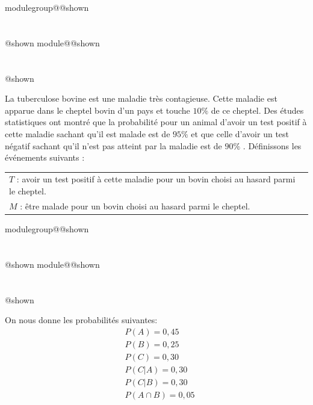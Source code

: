\documentclass{Evaluation}
\makeatletter
\newcommand{\currentmodulekey}{}
\newcommand{\currentmoduletitle}{}
\newcommand{\currentgroupkey}{}
\newcommand{\currentgrouptitle}{}
\newcommand{\showmoduleifneeded}{%
  \ifx\currentgroupkey\empty\else
    \expandafter\ifx\csname modulegroup@\currentgroupkey @shown\endcsname\relax
      \section*{\currentgrouptitle}%
      \expandafter\gdef\csname modulegroup@\currentgroupkey @shown\endcsname{1}%
    \fi
  \fi
  \expandafter\ifx\csname module@\currentmodulekey @shown\endcsname\relax
    \section*{\currentmoduletitle}%
    \expandafter\gdef\csname module@\currentmodulekey @shown\endcsname{1}%
  \fi
}
\newenvironment{H25}{\showmoduleifneeded}{}
\newenvironment{A25}{\showmoduleifneeded}{}
\makeatother
\begin{document}
\begin{questions}
\begin{H25}
\question {} %
La tuberculose bovine est une maladie très contagieuse. Cette maladie est apparue dans  le cheptel bovin d'un pays et touche $10 \%$ de ce cheptel. Des études statistiques ont montré que la probabilité pour un animal d'avoir un test positif à cette maladie sachant qu'il est malade est de $95 \%$  et que celle d'avoir un test négatif sachant qu'il n'est pas atteint par la maladie est de $90 \%$ . Définissons les événements suivants :\\
\begin{tabular}{ l}
$T$ : avoir un test positif à cette maladie pour un bovin choisi au hasard parmi le cheptel.\\
$M$ : être malade pour un bovin choisi au hasard parmi le cheptel.
\end{tabular}

\medskip
{}
\end{H25}

\begin{A25}
\question {} %
\label{A25-I19-module1_1}  
On nous donne les probabilités suivantes:
\[
\begin{aligned}
    & P(A) = 0,45 \\
    & P(B) = 0,25 \\
    & P(C) = 0,30 \\
    & P(C|A) = 0,30 \\
    & P(C|B) = 0,30 \\
    & P(A \cap B) = 0,05 \\
\end{aligned}
\]


\end{A25}
\end{questions}
\end{document}
